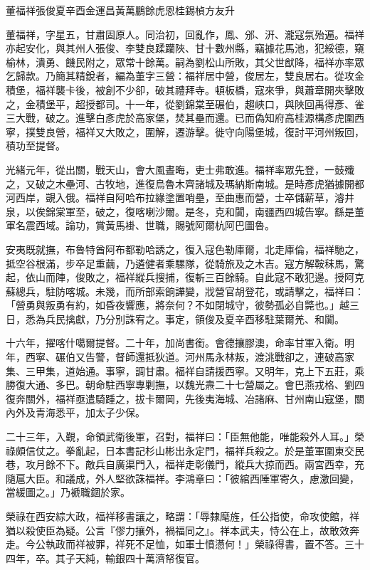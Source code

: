 
\begin{pinyinscope}
董福祥張俊夏辛酉金運昌黃萬鵬餘虎恩桂錫楨方友升

董福祥，字星五，甘肅固原人。同治初，回亂作，鳳、邠、汧、瀧寇氛殆遍。福祥亦起安化，與其州人張俊、李雙良蹂躪陜、甘十數州縣，竊據花馬池，犯綏德，窺榆林，潰勇、饑民附之，眾常十餘萬。嗣為劉松山所敗，其父世猷降，福祥亦率眾乞歸款。乃簡其精銳者，編為董字三營：福祥居中營，俊居左，雙良居右。從攻金積堡，福祥襲卡後，被創不少卻，破其禮拜寺。頓板橋，寇來爭，與蕭章開夾擊敗之，金積堡平，超授都司。十一年，從劉錦棠至碾伯，趨峽口，與陜回禹得彥、雀三大戰，破之。進擊白彥虎於高家堡，焚其壘而還。已而偽知府高桂源構彥虎圍西寧，撲雙良營，福祥又大敗之，圍解，遷游擊。徙守向陽堡城，復討平河州叛回，積功至提督。

光緒元年，從出關，戰天山，會大風晝晦，吏士弗敢進。福祥率眾先登，一鼓殲之，又破之木壘河、古牧地，進復烏魯木齊諸城及瑪納斯南城。是時彥虎猶據開都河西岸，覬入俄。福祥自阿哈布拉緣塗置哨壘，至曲惠而營，士卒儲薪草，濬井泉，以俟錦棠軍至，破之，復喀喇沙爾。是冬，克和闐，南疆西四城告寧。繇是董軍名震西域。論功，賞黃馬褂、世職，賜號阿爾杭阿巴圖魯。

安夷既就撫，布魯特酋阿布都勒哈誘之，復入寇色勒庫爾，北走庫倫，福祥馳之，抵空谷根滿，步卒足重繭，乃遴健者乘騾隊，從騎旅及之木吉。寇方解鞍秣馬，驚起，依山而陣，俊敗之，福祥縱兵搜捕，復斬三百餘騎。自此寇不敢犯邊。授阿克蘇總兵，駐防喀城。未幾，而所部索餉譁變，戕營官胡登花，或請擊之，福祥曰：「營勇與叛勇有約，如昏夜響應，將奈何？不如閉城守，彼勢孤必自斃也。」越三日，悉為兵民擒獻，乃分別誅宥之。事定，領俊及夏辛酉移駐葉爾羌、和闐。

十六年，擢喀什噶爾提督。二十年，加尚書銜。會德攘膠澳，命率甘軍入衛。明年，西寧、碾伯又告警，督師還抵狄道。河州馬永林叛，渡洮戰卻之，連破高家集、三甲集，道始通。事寧，調甘肅。福祥自請援西寧。又明年，克上下五莊，乘勝復大通、多巴。朝命駐西寧專剿撫，以魏光燾二十七營屬之。會巴燕戎格、劉四復奔關外，福祥亟遣騎踵之，拔卡爾岡，先後夷海城、冶諸麻、甘州南山寇堡，關內外及青海悉平，加太子少保。

二十三年，入覲，命領武衛後軍，召對，福祥曰：「臣無他能，唯能殺外人耳。」榮祿頗信仗之。拳亂起，日本書記杉山彬出永定門，福祥兵殺之。於是董軍圍東交民巷，攻月餘不下。敵兵自廣渠門入，福祥走彰儀門，縱兵大掠而西。兩宮西幸，充隨扈大臣。和議成，外人堅欲誅福祥。李鴻章曰：「彼綰西陲軍寄久，慮激回變，當緩圖之。」乃褫職錮於家。

榮祿在西安綜大政，福祥移書讓之，略謂：「辱隸麾旌，任公指使，命攻使館，祥猶以殺使臣為疑。公言『僇力攘外，禍福同之』。祥本武夫，恃公在上，故敢效奔走。今公執政而祥被罪，祥死不足恤，如軍士憤懣何！」榮祿得書，置不答。三十四年，卒。其子天純，輸銀四十萬濟帑復官。


\end{pinyinscope}
